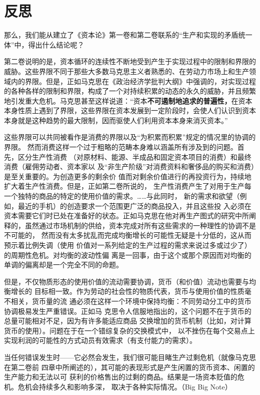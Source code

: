 \chapter{反思}
\label{chap:fansi}

那么，我们能从建立了《资本论》第一卷和第二卷联系的“生产和实现的矛盾统一体”中，得出什么结论呢？

第二卷说明的是，资本循环的连续性不断地受到产生于实现过程中的限制和界限的威胁。这些界限不同于那些大多数马克思主义者熟悉的、在劳动力市场上和生产领域内的界限。但是，正如马克思在《政治经济学批判大纲》中强调的，对实现过程的各种各样的限制和界限，构成了一个对持续积累的动态的永久的威胁，并且频繁地引发重大危机。马克思甚至这样说道：“资本\textbf{不可遏制地追求的普遍性，}在资本本身性质上遇到了界限，这些界限在资本发展到一定阶段时，会使人们认识到资本本身就是这种趋势的最大限制，因而驱使人们利用资本本身来消灭资本。” 

这些界限可以共同被看作是消费的界限以及“为积累而积累”规定的情况里的协调的界限。
然而消费这样一个过于粗略的范畴本身难以涵盖所有涉及到的问题。首先，区分生产性消费
（对原材料、能源、半成品和固定资本项目的消费）和最终消费（雇佣劳动者、资本家以
及“非生产阶级”对消费资料和奢侈品的购买和消费）是至关重要的。为创造更多的剩余价
值而对剩余价值进行的再投资行为，持续地扩大着生产性消费。但是，正如第二卷所说的，
生产性消费产生了对用于生产每一个独特的商品的特定的使用价值的需求。……与此同时，
新的需求和欲望（例如，最近的手机）的创造要求一个范围更广泛的商品投入，并且这些投
入必须在资本需要它们时已处在准备好的状态。正如马克思在他对再生产图式的研究中所阐
释的，虽然通过市场机制的供给，资本完成对所有这些需求的一种理性的协调不是不可能的，
然而没有太多扰乱而完成均衡增长的可能性无疑是十分低的，这从而预示着比例失调（使用
价值对一系列给定的生产过程的需求来说过多或过少了）的周期性危机。对均衡的波动性偏
离是一回事，由于这个或那个原因而对均衡的单调的偏离却是一个完全不同的命题。

但是，不仅物质形态的使用价值的流动需要协调，货币（和价值）流动也需要与均衡增长的
目标相一致。作为劳动的社会性的物质代表，货币与使用价值的性质毫不相关，货币量的流
通必须在这样一个环境中保持均衡：不同劳动分工中的货币协调极易发生严重错误。正如马
克思令人信服地指出的，这个问题不在于货币的总量可能相对不足，因为有许多能适应商品
交换增加的货币机制（比如，对计算货币的使用）。问题在于在一个错综复杂的交换模式中，
以不挫伤在每个交易点上实现利润的可能性的方式动员有效需求（有支付能力的需求）。

当任何错误发生时——它必然会发生，我们很可能目睹生产过剩危机（就像马克思在第二卷前
四章中所阐述的），其可能的表现形式是产生闲置的货币资本、闲置的生产能力和无法以可
获利的价格售出的过剩的商品。结果是一场资本贬值的危机。危机会持续多久和影响多深，
取决于各种实际情况。（Big Big Note）

